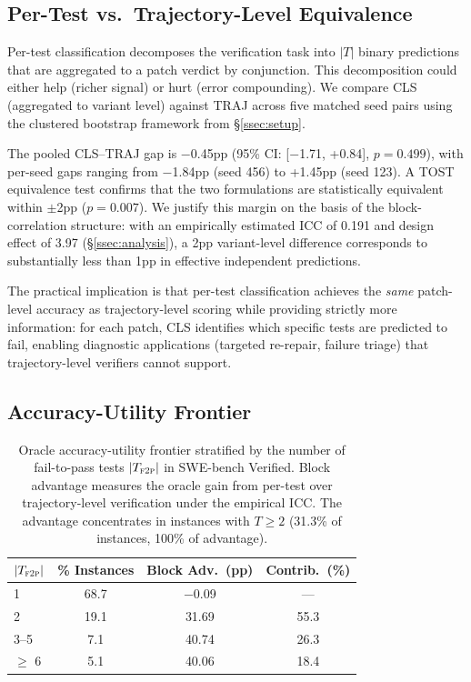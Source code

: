 \subsection{Per-Test vs.\ Trajectory-Level Equivalence}
\label{ssec:equivalence}


Per-test classification decomposes the verification task into $|T|$ binary predictions that are aggregated to a patch verdict by conjunction.
This decomposition could either help (richer signal) or hurt (error compounding).
We compare CLS (aggregated to variant level) against TRAJ across five matched seed pairs using the clustered bootstrap framework from \S\ref{ssec:setup}.

The pooled CLS--TRAJ gap is $-$0.45pp (95\% CI: [$-$1.71, +0.84], $p = 0.499$), with per-seed gaps ranging from $-$1.84pp (seed 456) to +1.45pp (seed 123).
A TOST equivalence test confirms that the two formulations are statistically equivalent within $\pm$2pp ($p = 0.007$).
We justify this margin on the basis of the block-correlation structure: with an empirically estimated ICC of 0.191 and design effect of 3.97 (\S\ref{ssec:analysis}), a 2pp variant-level difference corresponds to substantially less than 1pp in effective independent predictions.

The practical implication is that per-test classification achieves the \emph{same} patch-level accuracy as trajectory-level scoring while providing strictly more information: for each patch, CLS identifies which specific tests are predicted to fail, enabling diagnostic applications (targeted re-repair, failure triage) that trajectory-level verifiers cannot support.


\subsection{Accuracy-Utility Frontier}
\label{ssec:frontier}


\begin{table}[t]
\centering
\small
\begin{tabular}{lccc}
\toprule
$|T_{\textsc{f2p}}|$ & \textbf{\% Instances} & \textbf{Block Adv.\ (pp)} & \textbf{Contrib.\ (\%)} \\
\midrule
1 & 68.7 & $-$0.09 & --- \\
2 & 19.1 & 31.69 & 55.3 \\
3--5 & 7.1 & 40.74 & 26.3 \\
$\geq$ 6 & 5.1 & 40.06 & 18.4 \\
\bottomrule
\end{tabular}
\caption{Oracle accuracy-utility frontier stratified by the number of fail-to-pass tests $|T_{\textsc{f2p}}|$ in SWE-bench Verified. Block advantage measures the oracle gain from per-test over trajectory-level verification under the empirical ICC. The advantage concentrates in instances with $T \geq 2$ (31.3\% of instances, 100\% of advantage).}
\label{tab:frontier}
\end{table}

